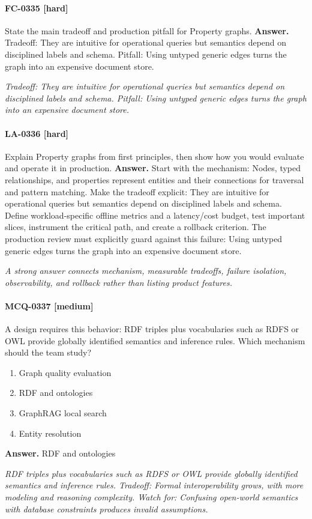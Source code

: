 \paragraph{FC-0335 [hard]} State the main tradeoff and production pitfall for Property graphs.
\noindent\textbf{Answer.} Tradeoff: They are intuitive for operational queries but semantics depend on disciplined labels and schema. Pitfall: Using untyped generic edges turns the graph into an expensive document store.
\par\textit{Tradeoff: They are intuitive for operational queries but semantics depend on disciplined labels and schema. Pitfall: Using untyped generic edges turns the graph into an expensive document store.}
\paragraph{LA-0336 [hard]} Explain Property graphs from first principles, then show how you would evaluate and operate it in production.
\noindent\textbf{Answer.} Start with the mechanism: Nodes, typed relationships, and properties represent entities and their connections for traversal and pattern matching. Make the tradeoff explicit: They are intuitive for operational queries but semantics depend on disciplined labels and schema. Define workload-specific offline metrics and a latency/cost budget, test important slices, instrument the critical path, and create a rollback criterion. The production review must explicitly guard against this failure: Using untyped generic edges turns the graph into an expensive document store.
\par\textit{A strong answer connects mechanism, measurable tradeoffs, failure isolation, observability, and rollback rather than listing product features.}
\paragraph{MCQ-0337 [medium]} A design requires this behavior: RDF triples plus vocabularies such as RDFS or OWL provide globally identified semantics and inference rules. Which mechanism should the team study?
\begin{enumerate}[label=\Alph*.]
\item Graph quality evaluation
\item RDF and ontologies
\item GraphRAG local search
\item Entity resolution
\end{enumerate}
\noindent\textbf{Answer.} RDF and ontologies
\par\textit{RDF triples plus vocabularies such as RDFS or OWL provide globally identified semantics and inference rules. Tradeoff: Formal interoperability grows, with more modeling and reasoning complexity. Watch for: Confusing open-world semantics with database constraints produces invalid assumptions.}

